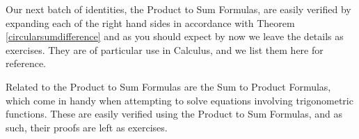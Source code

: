 \medskip

Our next batch of identities, the Product to Sum Formulas, are easily verified by expanding each of the right hand sides in accordance with Theorem \ref{circularsumdifference} and as you should expect by now we leave the details as exercises.  They are of particular use in Calculus, and we list them here for reference.


\smallskip


\smallskip

Related to the Product to Sum Formulas are the Sum to Product Formulas, which come in handy when attempting to solve equations involving trigonometric functions.  These are easily verified using the Product to Sum Formulas, and as such, their proofs are left as exercises.

\smallskip


